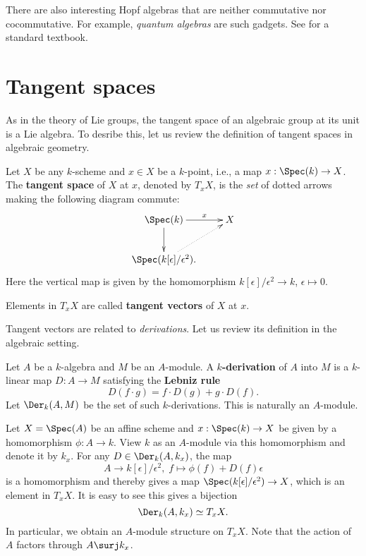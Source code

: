 \begin{rem}
	There are also interesting Hopf algebras that are neither commutative nor cocommutative. For example, \emph{quantum algebras} are such gadgets. See \cite{L} for a standard textbook.
\end{rem}


\section{Tangent spaces}

	As in the theory of Lie groups, the tangent space of an algebraic group at its unit is a Lie algebra. To desribe this, let us review the definition of tangent spaces in algebraic geometry.

\begin{defn}
	Let $X$ be any $k$-scheme and $x\in X$ be a $k$-point, i.e., a map $x: \Spec(k) \to X$. The \textbf{tangent space} of $X$ at $x$, denoted by $T_xX$, is the \emph{set} of dotted arrows making the following diagram commute:
	\[
		\xymatrix{
			\Spec(k) \ar[r]^-x \ar[d]
			& X \\
			\Spec(k[\epsilon]/\epsilon^2). \ar@{.>}[ru]
		}
	\]
	Here the vertical map is given by the homomorphism $k[\epsilon]/\epsilon^2 \to k$, $\epsilon\mapsto 0$.

	Elements in $T_xX$ are called \textbf{tangent vectors} of $X$ at $x$.
\end{defn}


	Tangent vectors are related to \emph{derivations}. Let us review its definition in the algebraic setting.

\begin{defn}
	Let $A$ be a $k$-algebra and $M$ be an $A$-module. A \textbf{$k$-derivation} of $A$ into $M$ is a $k$-linear map $D:A\to M$ satisfying the \textbf{Lebniz rule}
	\[
		D(f\cdot g) = f\cdot D (g) + g\cdot D (f).
	\]
	Let $\Der_k(A,M)$ be the set of such $k$-derivations. This is naturally an $A$-module.
\end{defn}

\begin{constr}
	Let $X=\Spec(A)$ be an affine scheme and $x:\Spec(k) \to X$ be given by a homomorphism $\phi:A\to k$. View $k$ as an $A$-module via this homomorphism and denote it by $k_x$. For any $D\in \Der_k(A,k_x)$, the map 
	\[
		A\to k[\epsilon]/\epsilon^2,\; f\mapsto \phi(f)+D(f)\epsilon
	\]
	is a homomorphism and thereby gives a map $\Spec(k[\epsilon]/\epsilon^2) \to X$, which is an element in $T_x X$. It is easy to see this gives a bijection
	\[
		\Der_k(A,k_x) \simeq T_x X.
	\]
	In particular, we obtain an $A$-module structure on $T_x X$. Note that the action of $A$ factors through $A\surj k_x$.
\end{constr}


